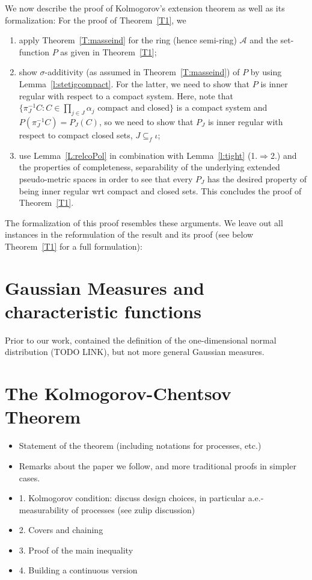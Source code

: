 \documentclass[lean]{Draft}
\begin{document}
We now describe the proof of Kolmogorov's extension theorem as well as
its formalization: For the proof of Theorem~\ref{T1}, we
\begin{enumerate}
  \item apply Theorem~\ref{T:masseind} for the ring (hence semi-ring)
    $\mathcal A$ and the set-function $P$ as given in
    Theorem~\ref{T1};
  \item show $\sigma$-additivity (as assumed in
    Theorem~\ref{T:masseind}) of $P$ by using
    Lemma~\ref{l:stetigcompact}. For the latter, we need to show that
    $P$ is inner regular with respect to a compact system. Here, note
    that $\{\pi_J^{-1}C : C \in \prod_{j\in J} \alpha_j \text{ compact
      and closed}\}$ is a compact system and $P(\pi_J^{-1}C) =
    P_J(C)$, so we need to show that $P_J$ is inner regular with
    respect to compact closed sets, $J\subseteq_f \iota$;
  \item use Lemma~\ref{L:relcoPol} in combination with
    Lemma~\ref{l:tight} (1.$\Rightarrow$2.) and the properties of
    completeness, separability of the underlying extended
    pseudo-metric spaces in order to see that every $P_J$ has the
    desired property of being inner regular wrt compact and closed
    sets. This concludes the proof of Theorem~\ref{T1}.
\end{enumerate}
The formalization of this proof resembles these arguments. We leave
out all instances in the reformulation of the result and its proof
(see below Theorem~\ref{T1} for a full formulation):




\section{Gaussian Measures and characteristic functions}

Prior to our work, \mathlib contained the definition of the one-dimensional normal distribution (TODO LINK), but not more general Gaussian measures.





\section{The Kolmogorov-Chentsov Theorem}
\label{S:continuity}

{\color{red}\small
\begin{itemize}
  \item Statement of the theorem (including notations for processes, etc.)
  \item Remarks about the paper we follow, and more traditional proofs in simpler cases.
  \item 1. Kolmogorov condition: discuss design choices, in particular a.e.-measurability of processes (see zulip discussion)
  \item 2. Covers and chaining
  \item 3. Proof of the main inequality
  \item 4. Building a continuous version
\end{itemize}
}
\end{document}

